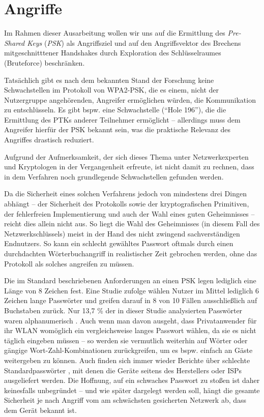 \section{Angriffe}
Im Rahmen dieser Ausarbeitung wollen wir uns auf die Ermittlung des \textit{Pre-Shared Keys} (\textit{PSK}) als Angriffsziel und auf den Angriffsvektor des Brechens mitgeschnitttener Handshakes durch Exploration des Schlüsselraumes (Bruteforce) beschränken.

Tatsächlich gibt es nach dem bekannten Stand der Forschung keine Schwachstellen im Protokoll von WPA2-PSK, die es einem, nicht der Nutzergruppe angehörenden, Angreifer ermöglichen würden, die Kommunikation zu entschlüsseln. Es gibt bspw. eine Schwachstelle (\enquote{Hole 196}), die die Ermittlung des PTKs anderer Teilnehmer ermöglicht -- allerdings muss dem Angreifer hierfür der PSK bekannt sein, was die praktische Relevanz des Angriffes drastisch reduziert.

Aufgrund der Aufmerksamkeit, der sich dieses Thema unter Netzwerkexperten und Kryptologen in der Vergangenheit erfreute, ist nicht damit zu rechnen, dass in dem Verfahren noch grundlegende Schwachstellen gefunden werden. 

Da die Sicherheit eines solchen Verfahrens jedoch von mindestens drei Dingen abhängt -- der Sicherheit des Protokolls sowie der kryptografischen Primitiven, der fehlerfreien Implementierung und auch der Wahl eines guten Geheimnisses -- reicht dies allein nicht aus. 
So liegt die Wahl des Geheimnisses (in diesem Fall des Netzwerkschlüssels) meist in der Hand des nicht zwingend sachverständigen Endnutzers. 
So kann ein schlecht gewähltes Passwort oftmals durch einen durchdachten Wörterbuchangriff in realistischer Zeit gebrochen werden, ohne das Protokoll als solches angreifen zu müssen.

Die im Standard beschriebenen Anforderungen an einen PSK legen lediglich eine Länge von 8 Zeichen fest. Eine Studie zufolge wählen Nutzer im Mittel lediglich 6 Zeichen lange Passwörter und greifen darauf in 8 von 10 Fällen ausschließlich auf Buchstaben zurück. Nur 13,7 \% der in dieser Studie analysierten Passwörter waren alphanumerisch \cite{zviran1999password}.
Auch wenn man davon ausgeht, dass Privatanwender für ihr WLAN womöglich ein vergleichsweise langes Passwort wählen, da sie es nicht täglich eingeben müssen -- so werden sie vermutlich weiterhin auf Wörter oder gängige Wort-Zahl-Kombinationen zurückgreifen, um es bspw. einfach an Gäste weitergeben zu können.
Auch finden sich immer wieder Berichte über schlechte Standardpasswörter \cite{stanched2015defaultpasswords}, mit denen die Geräte seitens des Herstellers oder ISPs ausgeliefert werden. Die Hoffnung, auf ein schwaches Passwort zu stoßen ist daher keinesfalls unbegründet -- und wie später dargelegt werden soll, hängt die gesamte Sicherheit je nach Angriff vom am schwächsten gesicherten Netzwerk ab, dass dem Gerät bekannt ist.\\

